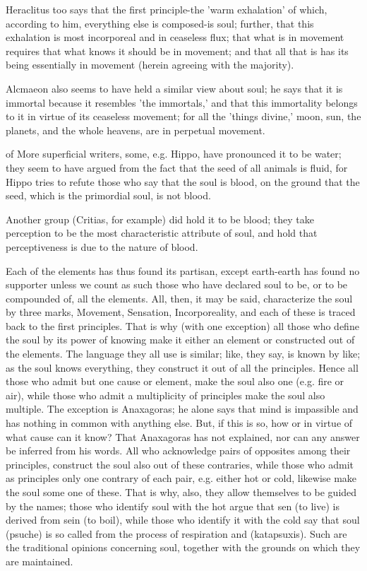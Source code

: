 Heraclitus too says that the first principle-the 'warm exhalation'
of which, according to him, everything else is composed-is soul; further,
that this exhalation is most incorporeal and in ceaseless flux; that
what is in movement requires that what knows it should be in movement;
and that all that is has its being essentially in movement (herein
agreeing with the majority). 

Alcmaeon also seems to have held a similar view about soul; he says
that it is immortal because it resembles 'the immortals,' and that
this immortality belongs to it in virtue of its ceaseless movement;
for all the 'things divine,' moon, sun, the planets, and the whole
heavens, are in perpetual movement. 

of More superficial writers, some, e.g. Hippo, have pronounced it
to be water; they seem to have argued from the fact that the seed
of all animals is fluid, for Hippo tries to refute those who say that
the soul is blood, on the ground that the seed, which is the primordial
soul, is not blood. 

Another group (Critias, for example) did hold it to be blood; they
take perception to be the most characteristic attribute of soul, and
hold that perceptiveness is due to the nature of blood. 

Each of the elements has thus found its partisan, except earth-earth
has found no supporter unless we count as such those who have declared
soul to be, or to be compounded of, all the elements. All, then, it
may be said, characterize the soul by three marks, Movement, Sensation,
Incorporeality, and each of these is traced back to the first principles.
That is why (with one exception) all those who define the soul by
its power of knowing make it either an element or constructed out
of the elements. The language they all use is similar; like, they
say, is known by like; as the soul knows everything, they construct
it out of all the principles. Hence all those who admit but one cause
or element, make the soul also one (e.g. fire or air), while those
who admit a multiplicity of principles make the soul also multiple.
The exception is Anaxagoras; he alone says that mind is impassible
and has nothing in common with anything else. But, if this is so,
how or in virtue of what cause can it know? That Anaxagoras has not
explained, nor can any answer be inferred from his words. All who
acknowledge pairs of opposites among their principles, construct the
soul also out of these contraries, while those who admit as principles
only one contrary of each pair, e.g. either hot or cold, likewise
make the soul some one of these. That is why, also, they allow themselves
to be guided by the names; those who identify soul with the hot argue
that sen (to live) is derived from sein (to boil), while those who
identify it with the cold say that soul (psuche) is so called from
the process of respiration and (katapsuxis). Such are the traditional
opinions concerning soul, together with the grounds on which they
are maintained. 

